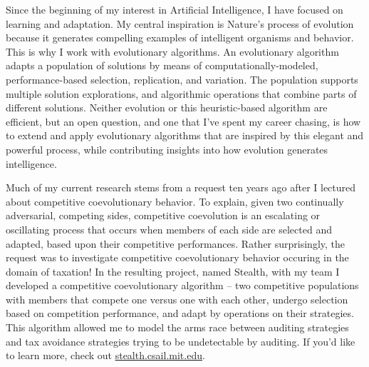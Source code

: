 \documentclass[12pt,bibliography=numbered]{article}
\begin{document}
%
%

\label{Evolutionary inspiration and algorithms}
\vspace{-0.5in}
\noindent 
Since the beginning of my interest in Artificial Intelligence, I have focused on learning and adaptation.
My central inspiration is Nature's process of evolution because it generates compelling examples of intelligent organisms and behavior.  
This is why I work with evolutionary algorithms.
An evolutionary algorithm adapts a population of solutions by means of computationally-modeled, performance-based selection, replication, and variation.  
The population supports multiple solution explorations, and algorithmic operations that combine parts of different solutions. 
Neither evolution or this heuristic-based algorithm are efficient, but an open question, and one that I've spent my career 
chasing, is how to extend and apply evolutionary algorithms that are inspired by this elegant and powerful process, while contributing insights into how evolution generates intelligence.

\label{STEALTH}
Much of my current research stems from a 
request ten years ago after I lectured about competitive coevolutionary behavior. 
To explain, given  two continually adversarial, competing sides, competitive coevolution is an escalating or oscillating process that occurs when members of each side are selected and adapted, based upon their competitive performances.
Rather surprisingly, the request was to investigate competitive coevolutionary behavior occuring in the domain of taxation! In the resulting project, named Stealth, with my team I developed a competitive coevolutionary algorithm --  two competitive populations with members that compete one versus one with each other, undergo selection based on competition performance, and adapt by operations on  their strategies. This algorithm allowed me to model the arms race between auditing strategies and tax avoidance strategies trying  to be undetectable by auditing. If you'd like to learn more, check out \url{stealth.csail.mit.edu}.
\end{document}
